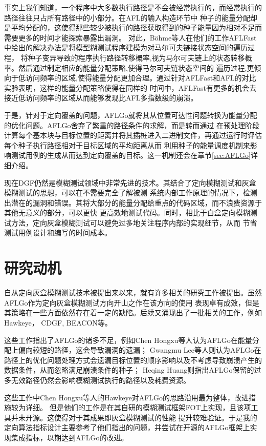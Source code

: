 \documentclass[bachelor]{njupthesis}
\begin{document}
事实上我们知道，一个程序中大多数执行路径是不会被经常执行的，而经常执行的路径往往只占所有路径中的小部分。在AFL的输入构造环节中
种子的能量分配却是平均分配的，这使得那些较少被执行的路径获取得到的种子能量因为相对不足而需要更多的时间才能探索暴露出漏洞。
对此，Böhme等人在他们的工作AFLFast\cite{2016Coverage}中给出的解决办法是将模型糊测试程序建模为对马尔可夫链接状态空间的遍历过程，
将种子变异导致的程序执行路径转移概率,视为马尔可夫链上的状态转移概率。然后通过制定相应的能量分配策略,使得马尔可夫链状态空间的
遍历过程,更倾向于低访问频率的区域,使得能量分配更加合理。通过针对AFLFast和AFL的对比实验表明，这样的能量分配策略使得在同样的
时间中，AFLFast有更多的机会去接近低访问频率的区域从而能够发现比AFL多指数级的崩溃\cite{2016Coverage}。

于是，针对于定向覆盖的问题，AFLGo就将其从位置可达性问题转换为能量分配的优化问题。AFLGo舍弃了繁重的路径条件的求解，而是转而通过
在预处理阶段计算每个基本块与目标位置的距离并将其插桩进入二进制文件，再通过运行时评估每个种子执行路径相对于目标区域的平均距离从而
利用种子的能量调度机制来影响测试用例的生成从而达到定向覆盖的目标。这一机制还会在章节\ref{sec:AFLGo}详细介绍。

现在DGF仍然是模糊测试领域中非常先进的技术。其结合了定向模糊测试和灰盒模糊测试的思想，可以在不需要完全了解被测
系统内部工作原理的情况下，检测出潜在的漏洞和错误。其将大部分的能量分配给重点的代码区域，而不浪费资源于其他无意义的部分，可以更快
更高效地测试代码。同时，相比于白盒定向模糊测试方法，定向灰盒模糊测试可以避免过多地关注程序内部的实现细节，从而
节省测试用例设计和编写的时间成本。
\section{研究动机}
自从定向灰盒模糊测试技术被提出来以来，就有许多相关的研究工作被提出。虽然AFLGo作为定向灰盒模糊测试方向开山之作在该方向的使用
表现卓有成效，但是其策略在一些方面依然存在着一定的缺陷。后续又涌现出了一批相关的工作，例如Hawkeye\cite{chen2018hawkeye}， 
CDGF\cite{lee2021constraint}, BEACON\cite{huang2022beacon}等。

这些工作指出了AFLGo的诸多不足，例如Chen Hongxu等人认为AFLGo在能量分配上偏向较短的路径，这会导致漏洞的遗漏\cite{chen2018hawkeye}；
Gwangmu Lee等人则认为AFLGo在路径上的优化问题处理方式会遗漏目标位置的顺序影响以及不考虑导致崩溃产生的数据条件，从而忽略满足崩溃条件的种子\cite{lee2021constraint}；
Heqing Huang则指出AFLGo保留的过多无效路径仍然会影响模糊测试执行的路径以及耗费资源\cite{huang2022beacon}。

这些工作中Chen Hongxu等人的Hawkeye\cite{chen2018hawkeye}对AFLGo的思路沿用最为整体，改进措施较为详细。
但是他们的工作是在其自研的模糊测试框架FOT\cite{chen2018fot}上实现，且该项工具并未开源。这使得对于其成果即灰盒模糊测试的性能
提升较难验证。于是我的定向算法指标设计主要参考了他们指出的问题，并尝试在开源的AFLGo框架上实现集成指标，以期达到AFLGo的改进。
\end{document}
